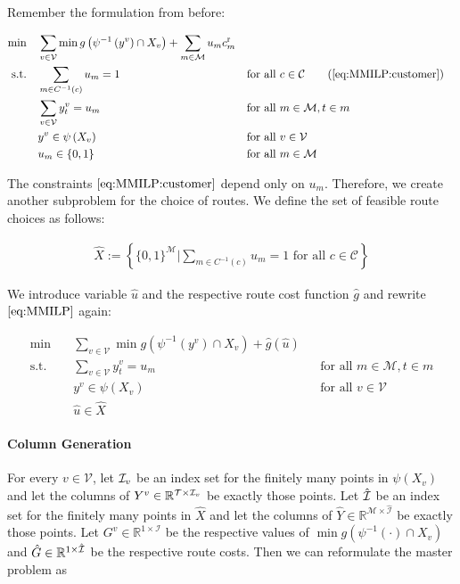 Remember the formulation from before:

\begin{align*}
	\min \quad & \sum_{v\in\mathcal{V}}\min g\left(\psi^{-1}\left(y^v\right)\cap X_v\right) + \sum_{m\in\mathcal{M}}u_m\croute_m \\
	\text{s.t.} \quad & \sum_{m\in C^{-1}(c)} u_m = 1 && \text{for all } c\in\mathcal{C} \tag{\ref{eq:MMILP:customer}} \\
	& \sum_{v\in\mathcal{V}}y^v_t = u_m && \text{for all } m\in\mathcal{M},t\in m \\
	& y^v\in \psi\left(X_v\right) && \text{for all } v\in\mathcal{V} \\
	& u_m\in\{0,1\} && \text{for all } m\in\mathcal{M}
\end{align*}

The constraints $\eqref{eq:MMILP:customer}$ depend only on $u_m$. Therefore, we create another subproblem for the choice of routes. We define the set of feasible route choices as follows:

\begin{align*}
	\hat{X} := \left\{\{0,1\}^{\mathcal{M}}|\sum_{m\in C^{-1}(c)} u_m = 1 \text{ for all } c\in\mathcal{C}\right\}
\end{align*}

We introduce variable $\hat{u}$ and the respective route cost function $\hat{g}$ and rewrite $\eqref{eq:MMILP}$ again:

\begin{align*}
	\min \quad & \sum_{v\in\mathcal{V}} \min g\left(\psi^{-1}\left(y^v\right)\cap X_v\right) + \hat{g}\left(\hat{u}\right) \\
	\text{s.t.} \quad & \sum_{v\in\mathcal{V}}y_t^v = u_m && \text{for all } m\in\mathcal{M},t\in m \\
	& y^v\in \psi\left(X_v\right) && \text{for all } v\in\mathcal{V} \\
	& \hat{u}\in\hat{X}
\end{align*}

\paragraph{Column Generation} \parfill

For every $v\in\mathcal{V}$, let $\mathcal{I}_v$ be an index set for the finitely many points in $\psi\left(X_v\right)$ and let the columns of $Y^v\in\mathbb{R}^{\mathcal{T}\times\mathcal{I}_v}$ be exactly those points. Let $\hat{\mathcal{I}}$ be an index set for the finitely many points in $\hat{X}$ and let the columns of $\hat{Y}\in\mathbb{R}^{\mathcal{M}\times\hat{\mathcal{I}}}$ be exactly those points. Let $G^v\in\mathbb{R}^{1\times\mathcal{I}}$ be the respective values of $\min g\left(\psi^{-1}(\cdot)\cap X_v\right)$ and $\hat{G}\in\mathbb{R}^{1\times\hat{\mathcal{I}}}$ be the respective route costs. Then we can reformulate the master problem as

